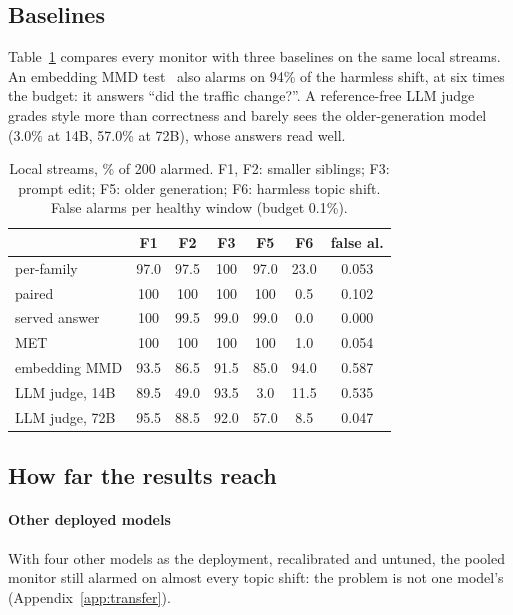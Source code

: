 \documentclass[11pt]{article}
\begin{document}
\subsection{Baselines}
\label{sec:baselines}

Table~\ref{tab:baselines} compares every monitor with three baselines on the same
local streams. An embedding MMD test~\citep{gretton2012kernel} also alarms on 94\%
of the harmless shift, at six times the budget: it answers ``did the traffic
change?''. A reference-free LLM judge grades style more than correctness and
barely sees the older-generation model (3.0\% at 14B, 57.0\% at 72B), whose answers
read well.

\begin{table}[t]
  \centering\small
  \caption{Local streams, \% of 200 alarmed. F1, F2: smaller siblings; F3: prompt
  edit; F5: older generation; F6: harmless topic shift. False alarms per healthy
  window (budget 0.1\%).}
  \label{tab:baselines}
  \setlength{\tabcolsep}{2.6pt}
  \begin{tabular}{lcccc|cc}
    \toprule
    & F1 & F2 & F3 & F5 & F6 & false al. \\
    \midrule
    per-family    & 97.0 & 97.5 & 100 & 97.0 & 23.0 & 0.053 \\
    paired        & 100 & 100 & 100 & 100 & 0.5 & 0.102 \\
    served answer & 100 & 99.5 & 99.0 & 99.0 & 0.0 & 0.000 \\
    \midrule
    MET           & 100 & 100 & 100 & 100 & 1.0 & 0.054 \\
    embedding MMD & 93.5 & 86.5 & 91.5 & 85.0 & 94.0 & 0.587 \\
    LLM judge, 14B & 89.5 & 49.0 & 93.5 & 3.0 & 11.5 & 0.535 \\
    LLM judge, 72B & 95.5 & 88.5 & 92.0 & 57.0 & 8.5 & 0.047 \\
    \bottomrule
  \end{tabular}
\end{table}

\subsection{How far the results reach}
\label{sec:reach}

\paragraph{Other deployed models} With four other models as the deployment,
recalibrated and untuned, the pooled monitor still alarmed on almost every topic
shift: the problem is not one model's (Appendix~\ref{app:transfer}).
\end{document}
